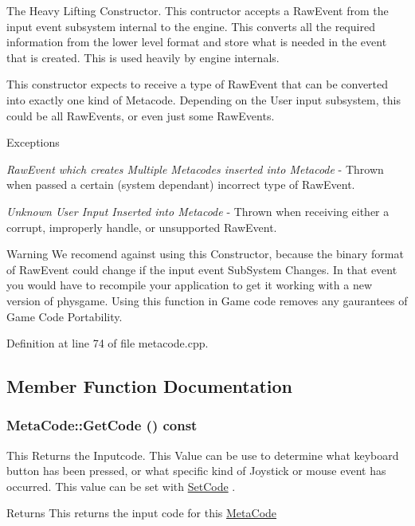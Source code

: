 The Heavy Lifting Constructor. This contructor accepts a RawEvent from the input event subsystem internal to the engine. This converts all the required information from the lower level format and store what is needed in the event that is created. This is used heavily by engine internals. \par
 This constructor expects to receive a type of RawEvent that can be converted into exactly one kind of Metacode. Depending on the User input subsystem, this could be all RawEvents, or even just some RawEvents. 
\begin{DoxyExceptions}{Exceptions}
\item[{\em RawEvent which creates Multiple Metacodes inserted into Metacode}]-\/ Thrown when passed a certain (system dependant) incorrect type of RawEvent. \item[{\em Unknown User Input Inserted into Metacode}]-\/ Thrown when receiving either a corrupt, improperly handle, or unsupported RawEvent. \end{DoxyExceptions}
\begin{DoxyWarning}{Warning}
We recomend against using this Constructor, because the binary format of RawEvent could change if the input event SubSystem Changes. In that event you would have to recompile your application to get it working with a new version of physgame. Using this function in Game code removes any gaurantees of Game Code Portability. 
\end{DoxyWarning}


Definition at line 74 of file metacode.cpp.

\subsection{Member Function Documentation}
\hypertarget{classMetaCode_a94532fc103d95f3de53eeccbadd6f17b}{
\subsubsection[{GetCode}]{ MetaCode::GetCode () const}}
\label{d7/d72/classMetaCode_a94532fc103d95f3de53eeccbadd6f17b}


This Returns the Inputcode. This Value can be use to determine what keyboard button has been pressed, or what specific kind of Joystick or mouse event has occurred. This value can be set with \hyperlink{classMetaCode_a9be5fcad22449c12b649801ab97bbf20}{SetCode} . \begin{DoxyReturn}{Returns}
This returns the input code for this \hyperlink{classMetaCode}{MetaCode} 
\end{DoxyReturn}


